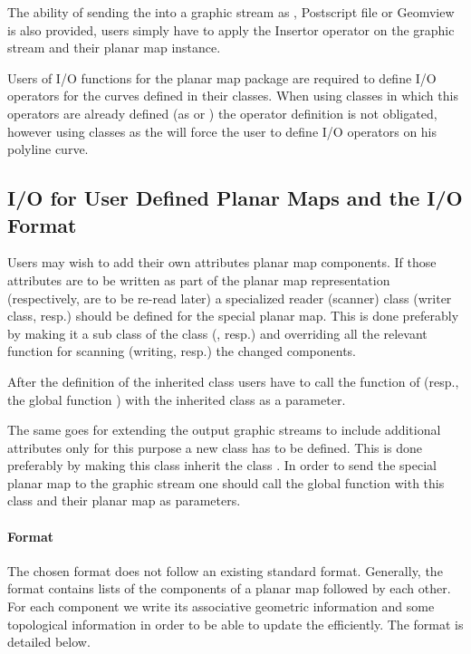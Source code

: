 
The ability of sending the  
into a graphic stream as , Postscript file or
Geomview is also provided, users simply have to apply the Insertor
operator on the graphic stream and their planar map instance.

Users of I/O functions for the planar map package are required to define I/O 
operators for the curves defined in their  classes. 
When using  classes in which this operators are already defined 
(as  or  ) the operator definition is not obligated, 
however using  classes as the  will force the user to define 
I/O operators on his polyline curve.

\begin{ccAdvanced}
\subsection*{I/O for User Defined Planar Maps and the I/O Format}

Users may wish to add their own attributes planar map components. If
those attributes are to be written as part of the planar map
representation (respectively, are to be re-read later) a specialized
reader (scanner) class (writer class, resp.) should be defined for the special
planar map. This is done preferably by making it a sub class of the class
 (, resp.) and
overriding all the relevant function for scanning (writing, resp.) the
changed components.

After the definition of the inherited class users have to call the function 
 of  (resp., the global function  ) with the inherited class as a parameter.

The same goes for extending the output graphic streams to include
additional attributes only for this purpose a new \/ class
has to be defined.  This is done preferably by making this class
inherit the class
. In order to send the special planar map to the graphic stream one should call the global function  
with this class and their planar map as parameters.

\paragraph{Format}
The chosen format does not follow an existing standard format.
Generally, the format contains lists of the components of a planar map
followed by each other. For each component we write its associative
geometric information and some topological information in order to be
able to update the  efficiently. The format is detailed
below.


\end{ccAdvanced}
